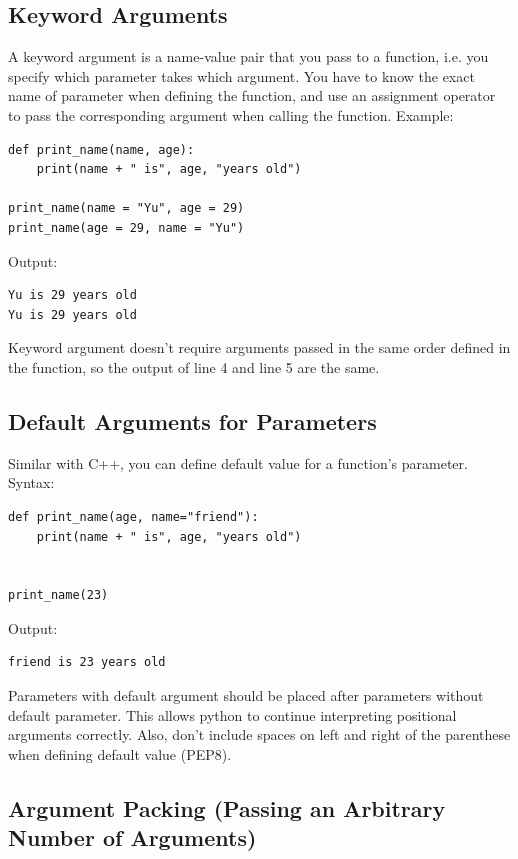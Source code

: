 \documentclass[12pt]{book}
\begin{document}
\subsection{Keyword Arguments \label{org8749712}}
\label{sec:org0b81ffa}
A keyword argument is a name-value pair that you pass to a function, i.e. you specify which parameter takes which argument. You have to know the exact name of parameter when defining the function, and use an assignment operator to pass the corresponding argument when calling the function. Example:
\begin{verbatim}
def print_name(name, age):
    print(name + " is", age, "years old")

print_name(name = "Yu", age = 29)
print_name(age = 29, name = "Yu")
\end{verbatim}
Output:
\begin{verbatim}
Yu is 29 years old
Yu is 29 years old
\end{verbatim}
Keyword argument doesn't require arguments passed in the same order defined in the function, so the output of line 4 and line 5 are the same.

\subsection{Default Arguments for Parameters}
\label{sec:orgb44a09c}
Similar with C++, you can define default value for a function's parameter. Syntax:
\begin{verbatim}
def print_name(age, name="friend"):
    print(name + " is", age, "years old")


print_name(23)
\end{verbatim}
Output:
\begin{verbatim}
friend is 23 years old
\end{verbatim}
Parameters with default argument should be placed after parameters without default parameter. This allows python to continue interpreting positional arguments correctly. Also, don't include spaces on left and right of the parenthese when defining default value (PEP8).

\subsection{Argument Packing (Passing an Arbitrary Number of Arguments)}
\label{sec:orgebd2815}
\end{document}
